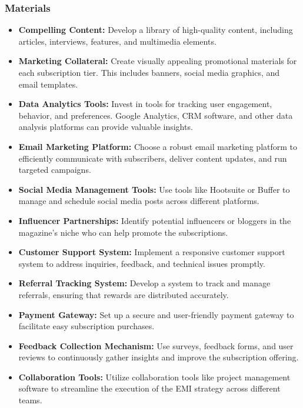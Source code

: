 \subsubsection{Materials}

\begin{itemize}
    \item \textbf{Compelling Content:} Develop a library of high-quality content, including articles, interviews, features, and multimedia elements.
    
    \item \textbf{Marketing Collateral:} Create visually appealing promotional materials for each subscription tier. This includes banners, social media graphics, and email templates.
    
    \item \textbf{Data Analytics Tools:} Invest in tools for tracking user engagement, behavior, and preferences. Google Analytics, CRM software, and other data analysis platforms can provide valuable insights.
    
    \item \textbf{Email Marketing Platform:} Choose a robust email marketing platform to efficiently communicate with subscribers, deliver content updates, and run targeted campaigns.
    
    \item \textbf{Social Media Management Tools:} Use tools like Hootsuite or Buffer to manage and schedule social media posts across different platforms.
    
    \item \textbf{Influencer Partnerships:} Identify potential influencers or bloggers in the magazine's niche who can help promote the subscriptions.
    
    \item \textbf{Customer Support System:} Implement a responsive customer support system to address inquiries, feedback, and technical issues promptly.
    
    \item \textbf{Referral Tracking System:} Develop a system to track and manage referrals, ensuring that rewards are distributed accurately.
    
    \item \textbf{Payment Gateway:} Set up a secure and user-friendly payment gateway to facilitate easy subscription purchases.
    
    \item \textbf{Feedback Collection Mechanism:} Use surveys, feedback forms, and user reviews to continuously gather insights and improve the subscription offering.
    
    \item \textbf{Collaboration Tools:} Utilize collaboration tools like project management software to streamline the execution of the EMI strategy across different teams.
\end{itemize}
